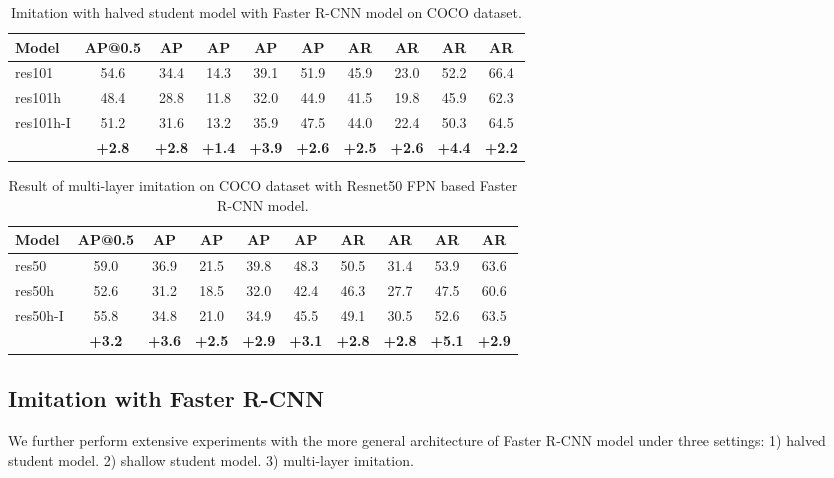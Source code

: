 \documentclass[10pt,twocolumn,letterpaper]{article}
\begin{document}
\begin{table}
	\small
	\renewcommand{\tabcolsep}{1.5pt}
	\renewcommand{\arraystretch}{1.1}
	\begin{tabular}{l|c|c|ccc|c|ccc}
		\hline
		Model     & AP@0.5 & AP   & AP  & AP  & AP  & AR   & AR  & AR  & AR  \\ \hline
		res101    & 54.6   & 34.4 & 14.3 & 39.1 & 51.9 & 45.9 & 23.0 & 52.2 & 66.4 \\ 
		res101h   & 48.4   & 28.8 & 11.8 & 32.0 & 44.9 & 41.5 & 19.8 & 45.9 & 62.3 \\ 
		res101h-I & 51.2& 31.6& 13.2& 35.9& 47.5& 44.0 & 22.4& 50.3& 64.5 \\ 
		&\textbf{+2.8} & \textbf{+2.8} &  \textbf{+1.4}&  \textbf{+3.9}& \textbf{ +2.6}&  \textbf{+2.5}&  \textbf{+2.6}&  \textbf{+4.4}&  \textbf{+2.2} \\  \hline
	\end{tabular}
	\caption{Imitation with halved student model with Faster R-CNN model on COCO dataset.}
	\label{exp_halved_student_COCO}
	\vspace{-4mm}
\end{table}

\begin{table}[h]
	\centering
	\small
	\renewcommand{\tabcolsep}{2.0pt}
	\renewcommand{\arraystretch}{1.1}
	\begin{tabular}{l|c|c|ccc|c|ccc}
		\hline
		Model     & AP@0.5 & AP   & AP  & AP  & AP  & AR   & AR  & AR  & AR  \\ \hline
		res50 & 59.0 & 36.9 & 21.5 & 39.8 & 48.3 & 50.5 & 31.4 & 53.9 & 63.6 \\ 
		res50h   & 52.6& 31.2& 18.5& 32.0& 42.4& 46.3& 27.7& 47.5& 60.6 \\ 
		res50h-I & 55.8 & 34.8 & 21.0 & 34.9 & 45.5 & 49.1 & 30.5 & 52.6 & 63.5 \\ 
		&\textbf{+3.2}& \textbf{+3.6}& \textbf{+2.5}& \textbf{+2.9}& \textbf{+3.1}& \textbf{+2.8}& \textbf{+2.8}& \textbf{+5.1}& \textbf{+2.9} \\  \hline	
	\end{tabular}
	\caption{Result of multi-layer imitation on COCO dataset with Resnet50 FPN based Faster R-CNN model.}	
	\label{exp_mutli_layer_imitation}
	\vspace{-4mm}
\end{table}

\subsection{Imitation with Faster R-CNN}
We further perform extensive experiments with the more general architecture of Faster R-CNN model under three settings: 1) halved student model. 2) shallow student model. 3) multi-layer imitation.
\vspace{-3mm}
\end{document}
